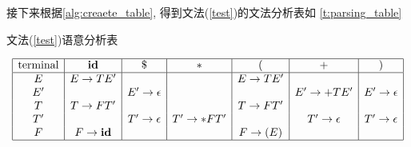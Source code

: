 \documentclass[../report]{subfiles}
\begin{document}
接下来根据\cref{alg:creaete_table},
得到文法(\ref{test})的文法分析表如%
\cref{t:parsing_table}

\begin{table}[H]
  \caption{文法(\ref{test})语意分析表}
  \label{t:parsing_table}
  \[
    \begin{array}{|c|c|c|c|c|c|c|}
      \hline
      \text{terminal}	&\textbf{id}	&\$	&*	&(	&+	&)\\ \hline
        E 	&	E \to T E' 	& 	& 	&	E \to T E' 	& 	&\\
        E' 	& 	&	E' \to \epsilon 	& 	& 	&	E' \to + T E' 	&	E' \to \epsilon\\
        T 	&	T \to F T' 	& 	& 	&	T \to F T' 	& 	&\\ 
        T' 	& 	&	T' \to \epsilon 	&	T' \to * F T' 	& 	&	T' \to \epsilon 	&	T' \to \epsilon\\
        F 	&	F \to \textbf{id} 	& 	& 	&	F \to ( E ) 	& 	&\\
      \hline
    \end{array}
  \]
\end{table}
\end{document}
